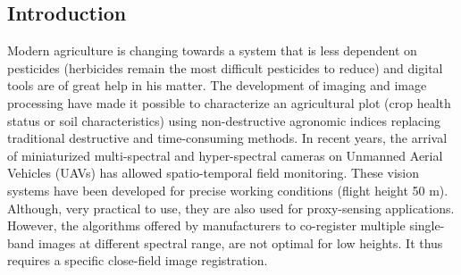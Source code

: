 \documentclass[../thesis.tex]{subfiles}
\begin{document}
	\newpage
	\subsection{Introduction}
	
	\par Modern agriculture is changing towards a system that is less dependent on pesticides \cite{10.1371/journal.pone.0097922}
	(herbicides remain the most difficult pesticides to reduce) and digital tools are of great help in his matter.
	The development of imaging and image processing have made it possible to characterize an agricultural plot \cite{SANKARAN2015112}
	(crop health status or soil characteristics) using non-destructive agronomic indices \cite{10.1371/journal.pone.0072736}
	replacing traditional destructive and time-consuming methods.
	In recent years, the arrival of miniaturized multi-spectral and hyper-spectral cameras on Unmanned Aerial Vehicles (UAVs)
	has allowed spatio-temporal field monitoring. These vision systems have been developed for precise working conditions (flight height 50 m).
	Although, very practical to use, they are also used for proxy-sensing applications.
	However, the algorithms	offered by manufacturers to co-register multiple single-band images at different spectral range,
	are not optimal for low heights. It thus requires a specific close-field image registration.
	
\end{document}
